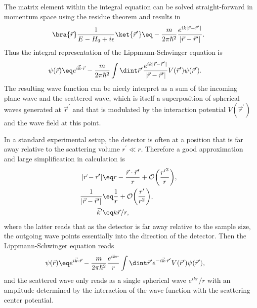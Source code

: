 \documentclass[\main/dresen_thesis.tex]{subfiles}
\begin{document}
The matrix element within the integral equation  can be solved straight-forward in momentum space using the residue theorem and results in
\begin{align}
  \bra{\vec{r}}\frac{1}{E - H_0 + i \epsilon} \ket{\vec{r}^\prime} \eq -\frac{m}{2 \pi \hbar^2} \frac{e^{ik|\vec{r} - \vec{r}^\prime|}}{|\vec{r} - \vec{r}^\prime|}.
\end{align}
Thus the integral representation of the Lippmann-Schwinger equation is
\begin{align}
  \psi (\vec{r}) &\eq e^{i\vec{k} \cdot \vec{r}} - \frac{m}{2 \pi\hbar^2} \int \dint \vec{r}^\prime \frac{e^{ik|\vec{r} - \vec{r}^\prime|}}{|\vec{r} - \vec{r}^\prime|} V (\vec{r}^\prime)\psi (\vec{r}^\prime).
\end{align}
The resulting wave function can be nicely interpret as a sum of the incoming plane wave and the scattered wave, which is itself a superposition of spherical waves generated at $\vec{r}^\prime$ and that is modulated by the interaction potential $V(\vec{r}^\prime)$ and the wave field at this point.

In a standard experimental setup, the detector is often at a position that is far away relative to the scattering volume $r^\prime \ll r$. 
Therefore a good approximation and large simplification in calculation is
\begin{align}
  |\vec{r} - \vec{r}^\prime| \eq& r - \frac{\vec{r} \cdot \vec{r}^\prime}{r} + \mathcal{O}\bigg(\frac{{r^\prime}^2}{r}\bigg),\\
  \frac{1}{|\vec{r} - \vec{r}^\prime|} \eq& \frac{1}{r} + \mathcal{O}\bigg(\frac{r^\prime}{r^2} \bigg),\\
  \vec{k}^\prime \eq& k \vec{r} / r,
\end{align}
where the latter reads that as the detector is far away relative to the sample size, the outgoing wave points essentially into the direction of the detector. 
Then the Lippmann-Schwinger equation reads
\begin{align}
  \psi (\vec{r}) &\eq e^{i\vec{k} \cdot \vec{r}} - \frac{m}{2 \pi\hbar^2} \frac{e^{ikr}}{r} \int \dint \vec{r}^\prime e^{-i\vec{k} \cdot \vec{r}^\prime} V (\vec{r}^\prime)\psi (\vec{r}^\prime),
\end{align}
and the scattered wave only reads as a single spherical wave $e^{ikr} / r$ with an amplitude determined by the interaction of the wave function with the scattering center potential.
\end{document}
